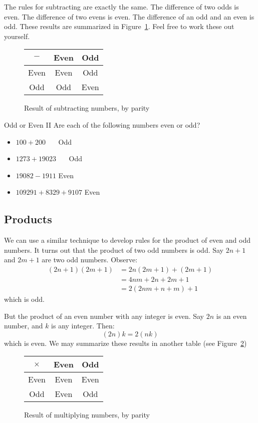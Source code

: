 \documentclass[a4paper,10pt]{report}
\begin{document}
The rules for subtracting are exactly the same. The difference of two odds is
even. The difference of two evens is even. The difference of an odd and an even
is odd. These results are summarized in Figure~\ref{pd:pdifft}. Feel free to
work these out yourself.

\begin{figure}
 \begin{tabular}{c|cc}
  \(-\) & Even & Odd  \\
  \hline
  Even   & Even & Odd \\
  Odd    & Odd & Even
 \end{tabular}

 \caption{Result of subtracting numbers, by parity}
 \label{pd:pdifft}
\end{figure}

\begin{problem}{Odd or Even II}
 Are each of the following numbers even or odd?

 \begin{itemize}
  \item \(100 + 200\) \hfill {}~~~Odd
  \item \(1273 + 19023\) \hfill {}~~~Odd
  \item \(19082 - 1911\) \hfill Even~~~
  \item \(109291 + 8329 + 9107\) \hfill Even~~~
 \end{itemize}
\end{problem}

\subsection{Products}

We can use a similar technique to develop rules for the product of even and odd
numbers. It turns out that the product of two odd numbers is odd. Say \(2n+1\)
and \(2m+1\) are two odd numbers. Observe: \begin{align*}
 (2n+1)(2m+1)
 &= 2n(2m+1) + (2m+1) \\
 &= 4nm+2n+2m+1 \\
 &= 2(2nm+n+m) + 1
\end{align*} which is odd.

But the product of an even number with any integer is even. Say \(2n\) is an
even number, and \(k\) is any integer. Then: \[
 (2n)k = 2(nk)
\] which is even. We may summarize these results in another table (see
Figure~\ref{pd:pprodt})

\begin{figure}
 \begin{tabular}{c|cc}
  \(\times\) & Even & Odd  \\
  \hline
  Even   & Even & Even \\
  Odd    & Even & Odd
 \end{tabular}

 \caption{Result of multiplying numbers, by parity}
 \label{pd:pprodt}
\end{figure}
\end{document}
